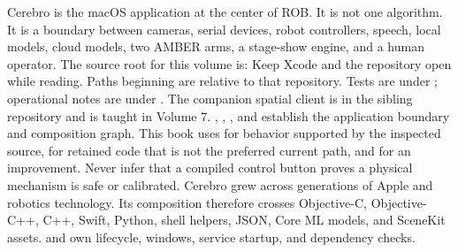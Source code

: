 \markdownRendererDocumentBegin
\markdownRendererSectionBegin
{}\markdownRendererInterblockSeparator
{}Cerebro is the macOS application at the center of ROB. It is not one algorithm. It is a boundary between cameras, serial devices, robot controllers, speech, local models, cloud models, two AMBER arms, a stage-show engine, and a human operator. The source root for this volume is:\markdownRendererInterblockSeparator
{}\markdownRendererInterblockSeparator
{}Keep Xcode and the repository open while reading. Paths beginning  are relative to that repository. Tests are under ; operational notes are under . The companion spatial client is in the sibling  repository and is taught in Volume 7.\markdownRendererInterblockSeparator
{}\markdownRendererBlockQuoteBegin
{} , , , and  establish the application boundary and composition graph.\markdownRendererBlockQuoteEnd \markdownRendererInterblockSeparator
{}This book uses  for behavior supported by the inspected source,  for retained code that is not the preferred current path, and  for an improvement. Never infer that a compiled control button proves a physical mechanism is safe or calibrated.\markdownRendererInterblockSeparator
{}
\markdownRendererSectionEnd \markdownRendererSectionBegin
{}\markdownRendererInterblockSeparator
{}Cerebro grew across generations of Apple and robotics technology. Its composition therefore crosses Objective-C, Objective-C++, C++, Swift, Python, shell helpers, JSON, Core ML models, and SceneKit assets.\markdownRendererInterblockSeparator
{}\markdownRendererUlBegin
\markdownRendererUlItem {}  and  own lifecycle, windows, service startup, and dependency checks.\markdownRendererUlItemEnd 
